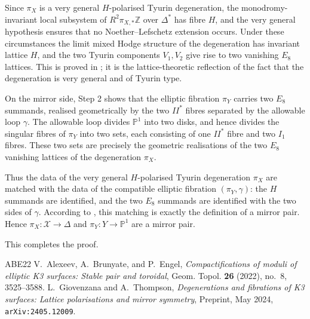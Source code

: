 \documentclass{article}
\theoremstyle{plain}
\begin{document}
Since $\pi_X$ is a very general $H$-polarised Tyurin degeneration, the monodromy-invariant local subsystem of $R^2\pi_{X,*}\mathbb Z$ over $\Delta^*$ has fibre $H$, and the very general hypothesis ensures that no Noether--Lefschetz extension occurs. Under these circumstances the limit mixed Hodge structure of the degeneration has invariant lattice $H$, and the two Tyurin components $V_1,V_2$ give rise to two vanishing $E_8$ lattices. This is proved in \cite[Proposition 3.22]{dfk3slpms}; it is the lattice-theoretic reflection of the fact that the degeneration is very general and of Tyurin type.

On the mirror side, Step 2 shows that the elliptic fibration $\pi_Y$ carries two $E_8$ summands, realised geometrically by the two $II^*$ fibres separated by the allowable loop $\gamma$. The allowable loop divides $\mathbb P^1$ into two disks, and hence divides the singular fibres of $\pi_Y$ into two sets, each consisting of one $II^*$ fibre and two $I_1$ fibres. These two sets are precisely the geometric realisations of the two $E_8$ vanishing lattices of the degeneration $\pi_X$.

Thus the data of the very general $H$-polarised Tyurin degeneration $\pi_X$ are matched with the data of the compatible elliptic fibration $(\pi_Y,\gamma)$: the $H$ summands are identified, and the two $E_8$ summands are identified with the two sides of $\gamma$. According to \cite[Definition 5.1]{dfk3slpms}, this matching is exactly the definition of a mirror pair. Hence $\pi_X\colon \mathcal X\to \Delta$ and $\pi_Y\colon Y\to \mathbb P^1$ are a mirror pair.

This completes the proof.

\begin{thebibliography}{ABE22}
 V.~Alexeev, A.~Brunyate, and P.~Engel,
\emph{Compactifications of moduli of elliptic {K3} surfaces: Stable pair and toroidal},
Geom. Topol. \textbf{26} (2022), no.~8, 3525--3588.
 L.~Giovenzana and A.~Thompson,
\emph{Degenerations and fibrations of {K3} surfaces: Lattice polarisations and mirror symmetry},
Preprint, May 2024, \texttt{arXiv:2405.12009}.
\end{thebibliography}
\end{document}
